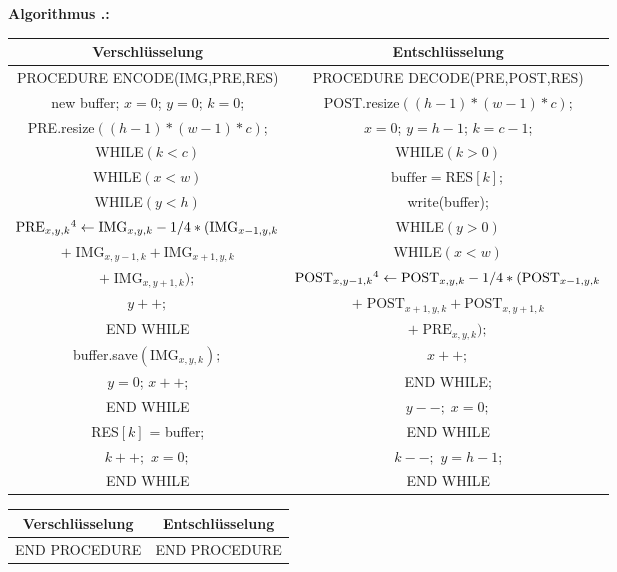 \documentclass[a4paper,12pt]{article}
\newcounter{Algorithmus}
\newenvironment{Algorithmus}{
\medskip
        
        \setlength{\parindent}{0pt}
        \addtocounter{Algorithmus}{1}
        \textbf{\textsf{Algorithmus \thesubsection.\theAlgorithmus}:}}{
        \nopagebreak
        \vspace{-1.0ex}
        \bigskip
        
}
\begin{document}
\begin{Algorithmus}
\\
\begin{tabular}{c|c}
Verschlüsselung & Entschlüsselung
\\
\hline
PROCEDURE ENCODE(IMG,PRE,RES) & PROCEDURE DECODE(PRE,POST,RES)
\\
new buffer; $x=0$; $y=0$; $k=0$; & POST.resize$((h-1)*(w-1)*c)$;
\\
PRE.resize$((h-1)*(w-1)*c)$; & $x=0$; $y=h-1$; $k=c-1$;
\\
WHILE$(k < c)$ &                  WHILE$(k > 0)$
\\
WHILE$(x < w)$ &               $\text{buffer} = \text{RES}[k];$
\\
WHILE$(y < h)$ &            write(buffer);
\\
$\text{PRE}_{x,y,k}\footnotemark[4]\leftarrow \text{IMG}_{x,y,k} - 1/4 *(\text{IMG}_{x-1,y,k}$ & WHILE$(y > 0)$ 
\\
$+\;\text{IMG}_{x,y-1,k} + \text{IMG}_{x+1,y,k}$  &  WHILE$(x<w)$
\\
$+\;\text{IMG}_{x,y+1,k});$ & $\text{POST}_{x,y-1,k}\footnotemark[4]\leftarrow \text{POST}_{x,y,k} - 1/4 *(\text{POST}_{x-1,y,k} $ 
\\
$y++;$ &   $+\;\text{POST}_{x+1,y,k}  + \text{POST}_{x,y+1,k}$  
\\
END WHILE  & $+\;\text{PRE}_{x,y,k});$
\\
buffer.save$(\text{IMG}_{x,y,k});$  & $x++;$
\\
$y=0$; $x++$;  &   END WHILE; 
\\
END WHILE   & $y--;\;x=0;$ 
\\
RES$[k]$ = buffer;  &  END WHILE 
\\
$k++;$ $x=0;$   &   $k--;$ $y=h-1$;
\\
END WHILE & END WHILE 
\end{tabular}
\begin{tabular}{c|c}
Verschlüsselung & Entschlüsselung
\\
\hline
END PROCEDURE & END PROCEDURE
\end{tabular}
\end{Algorithmus}
\end{document}
